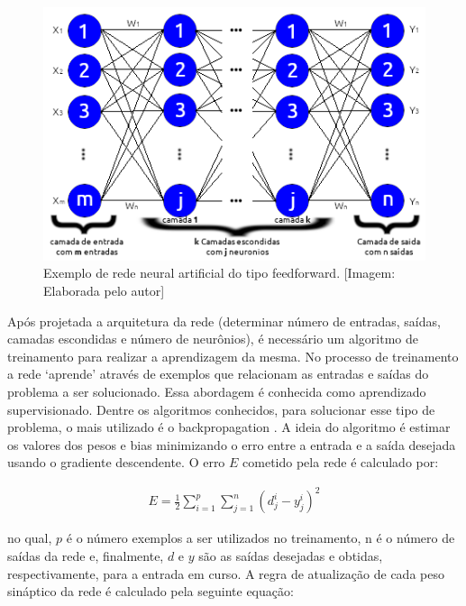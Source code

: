 \begin{figure}[ht]
\centering
\includegraphics[width=1\textwidth]{figuras/rede_neural_Feedforward.png}
\caption{Exemplo de rede neural artificial do tipo feedforward. [Imagem: Elaborada pelo autor]}
\label{figredeFeedforward}
\end{figure}

Após projetada a arquitetura da rede (determinar número de entradas, saídas, camadas escondidas e número de neurônios), é necessário um algoritmo de treinamento para realizar a aprendizagem da mesma. No processo de treinamento a rede ‘aprende’ através de exemplos que relacionam as entradas e saídas do problema a ser solucionado. Essa abordagem é conhecida como aprendizado supervisionado. Dentre os algoritmos conhecidos, para solucionar esse tipo de problema, o mais utilizado é o backpropagation \cite{rumelhart1986learning}. A ideia do algoritmo é estimar os valores dos pesos e bias minimizando o erro entre a entrada e a saída desejada usando o gradiente descendente. O erro \(E\) cometido pela rede é calculado por:

\begin{equation} \label{eq3}
\begin{split}
E = \frac{1}{2} \sum_{i=1}^{p} \sum_{j=1}^{n} (d_{j}^{i} - y_{j}^{i})^2
\end{split}
\end{equation}

no qual, \(p\) é o número exemplos a ser utilizados no treinamento, n é o número de saídas da rede e, finalmente, \(d\) e \(y\) são as saídas desejadas e obtidas, respectivamente, para a entrada em curso.
A regra de atualização de cada peso sináptico da rede é calculado pela seguinte equação:

